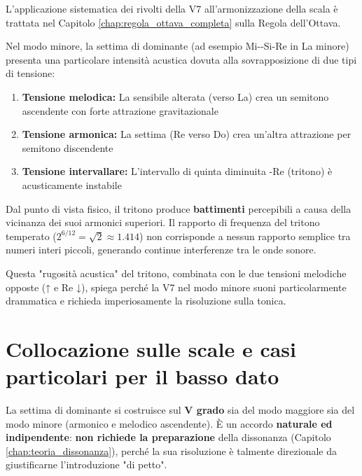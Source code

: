 L'applicazione sistematica dei rivolti della V7 all'armonizzazione della scala è trattata nel Capitolo \ref{chap:regola_ottava_completa} sulla Regola dell'Ottava.

\begin{fisica}
	Nel modo minore, la settima di dominante (ad esempio Mi-\Soldiesis -Si-Re in La minore) presenta una particolare intensità acustica dovuta alla sovrapposizione di due tipi di tensione:
	
	\begin{enumerate}
		\item \textbf{Tensione melodica:} La sensibile alterata (\Soldiesis  verso La) crea un semitono ascendente con forte attrazione gravitazionale
		\item \textbf{Tensione armonica:} La settima (Re verso Do) crea un'altra attrazione per semitono discendente
		\item \textbf{Tensione intervallare:} L'intervallo di quinta diminuita \Soldiesis -Re (tritono) è acusticamente instabile
	\end{enumerate}
	
	Dal punto di vista fisico, il tritono produce \textbf{battimenti} percepibili a causa della vicinanza dei suoi armonici superiori. Il rapporto di frequenza del tritono temperato ($2^{6/12} = \sqrt{2} \approx 1.414$) non corrisponde a nessun rapporto semplice tra numeri interi piccoli, generando continue interferenze tra le onde sonore.
	
	Questa "rugosità acustica" del tritono, combinata con le due tensioni melodiche opposte (\Soldiesis  ↑ e Re ↓), spiega perché la V7 nel modo minore suoni particolarmente drammatica e richieda imperiosamente la risoluzione sulla tonica.
\end{fisica}

\section{Collocazione sulle scale e casi particolari per il basso dato}
\label{sec:v7_basso_dato}

\begin{regola}
	\label{reg:collocazione_v7}
	La settima di dominante si costruisce sul \textbf{V grado} sia del modo maggiore sia del modo minore (armonico e melodico ascendente). È un accordo \textbf{naturale ed indipendente}: \textbf{non richiede la preparazione} della dissonanza (Capitolo \ref{chap:teoria_dissonanza}), perché la sua risoluzione è talmente direzionale da giustificarne l'introduzione "di petto".
\end{regola}

